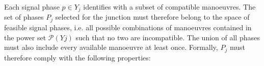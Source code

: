 Each signal phase $p \in Y_j$ identifies with a subset of compatible manoeuvres. The set of phases $P_j$ selected for the junction must therefore belong to the space of feasible signal phases, i.e. all possible combinations of manoeuvres contained in the power set $\mathcal{P}(Yj)$ such that no two are incompatible. The union of all phases must also include every available manoeuvre at least once. Formally, $P_j$ must therefore comply with the following properties:
